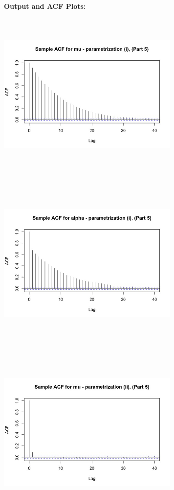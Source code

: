 \documentclass[10pt,a4paper]{article}
\begin{document}
\textbf{Output and ACF Plots:}\\
\includegraphics[width=9cm,height=9cm,keepaspectratio]{part5mu1}
\includegraphics[width=9cm,height=9cm,keepaspectratio]{part5alpha1}
\includegraphics[width=9cm,height=9cm,keepaspectratio]{part5mu2}
\end{document}
